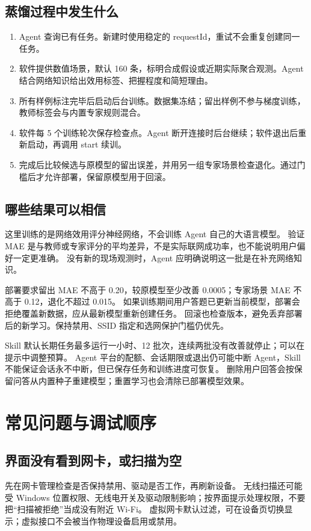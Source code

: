 \documentclass[UTF8,fontset=fandol,11pt,a4paper]{ctexart}
\begin{document}
\subsection{蒸馏过程中发生什么}
\begin{enumerate}
\item Agent 查询已有任务。新建时使用稳定的 requestId，重试不会重复创建同一任务。
\item 软件提供数值场景，默认 160 条，标明合成假设或近期实际聚合观测。Agent 结合网络知识给出效用标签、把握程度和简短理由。
\item 所有样例标注完毕后启动后台训练。数据集冻结；留出样例不参与梯度训练，教师标签会与内置专家规则混合。
\item 软件每 5 个训练轮次保存检查点。Agent 断开连接时后台继续；软件退出后重新启动，再调用 start 续训。
\item 完成后比较候选与原模型的留出误差，并用另一组专家场景检查退化。通过门槛后才允许部署，保留原模型用于回滚。
\end{enumerate}

\subsection{哪些结果可以相信}
这里训练的是网络效用评分神经网络，不会训练 Agent 自己的大语言模型。
验证 MAE 是与教师或专家评分的平均差异，不是实际联网成功率，也不能说明用户偏好一定更准确。
没有新的现场观测时，Agent 应明确说明这一批是在补充网络知识。

部署要求留出 MAE 不高于 0.20，较原模型至少改善 0.0005；专家场景 MAE 不高于 0.12，退化不超过 0.015。
如果训练期间用户答题已更新当前模型，部署会拒绝覆盖新数据，应从最新模型重新创建任务。
回滚也检查版本，避免丢弃部署后的新学习。保持禁用、SSID 指定和选网保护门槛仍优先。

Skill 默认长期任务最多运行一小时、12 批次，连续两批没有改善就停止；可以在提示中调整预算。
Agent 平台的配额、会话期限或退出仍可能中断 Agent，Skill 不能保证会话永不中断，但已保存任务和训练进度可恢复。
删除用户回答会按保留问答从内置种子重建模型；重置学习也会清除已部署模型效果。

\section{常见问题与调试顺序}
\subsection{界面没有看到网卡，或扫描为空}
先在网卡管理检查是否保持禁用、驱动是否工作，再刷新设备。
无线扫描还可能受 Windows 位置权限、无线电开关及驱动限制影响；按界面提示处理权限，不要把“扫描被拒绝”当成没有附近 Wi-Fi。
虚拟网卡默认过滤，可在设备页切换显示；虚拟接口不会被当作物理设备启用或禁用。
\end{document}
